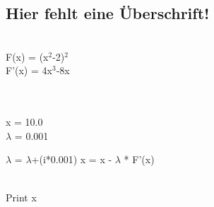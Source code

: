\subsection{Hier fehlt eine Überschrift!}

\begin{algorithmic}[1]

   \\F(x) = (x$^2$-2)$^2$
\\F'(x) = 4x$^3$-8x

\\
\\x = 10.0
\\$\lambda$ = 0.001

 	\State $\lambda$ = $\lambda$+(i*0.001)
\State x = x - $\lambda$ * F'(x)
\EndFor
 \EndFor
 
 \\Print x\EndProcedure
\Statex
\end{algorithmic}